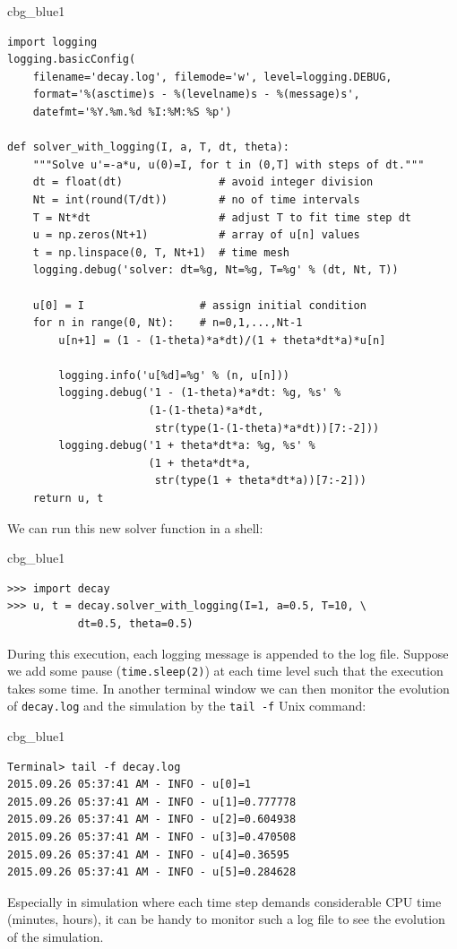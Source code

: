 \documentclass[%
oneside,                 %
final,                   %
10pt]{article}
\newenvironment{_cod_tight}[1]{
   \def\FrameCommand{\colorbox{#1}}
   \FrameRule0.6pt\MakeFramed {\FrameRestore}\vskip3mm}
   {\vskip0mm\endMakeFramed}
\newenvironment{cod}[1]{
\bgroup\rmfamily
\fboxsep=0mm\relax
\begin{_cod_tight}{#1}
\list{}{\parsep=-2mm\parskip=0mm\topsep=0pt\leftmargin=2mm
\rightmargin=2\leftmargin\leftmargin=4pt\relax}
\item\relax}
{\endlist\end{_cod_tight}\egroup}
\begin{document}
\begin{cod}{cbg_blue1}\begin{Verbatim}[numbers=none,fontsize=\fontsize{9pt}{9pt},baselinestretch=0.95,xleftmargin=2mm]
import logging
logging.basicConfig(
    filename='decay.log', filemode='w', level=logging.DEBUG,
    format='%(asctime)s - %(levelname)s - %(message)s',
    datefmt='%Y.%m.%d %I:%M:%S %p')

def solver_with_logging(I, a, T, dt, theta):
    """Solve u'=-a*u, u(0)=I, for t in (0,T] with steps of dt."""
    dt = float(dt)               # avoid integer division
    Nt = int(round(T/dt))        # no of time intervals
    T = Nt*dt                    # adjust T to fit time step dt
    u = np.zeros(Nt+1)           # array of u[n] values
    t = np.linspace(0, T, Nt+1)  # time mesh
    logging.debug('solver: dt=%g, Nt=%g, T=%g' % (dt, Nt, T))

    u[0] = I                  # assign initial condition
    for n in range(0, Nt):    # n=0,1,...,Nt-1
        u[n+1] = (1 - (1-theta)*a*dt)/(1 + theta*dt*a)*u[n]

        logging.info('u[%d]=%g' % (n, u[n]))
        logging.debug('1 - (1-theta)*a*dt: %g, %s' %
                      (1-(1-theta)*a*dt,
                       str(type(1-(1-theta)*a*dt))[7:-2]))
        logging.debug('1 + theta*dt*a: %g, %s' %
                      (1 + theta*dt*a,
                       str(type(1 + theta*dt*a))[7:-2]))
    return u, t
\end{Verbatim}
\end{cod}
\noindent
We can run this new solver function in a shell:

\begin{cod}{cbg_blue1}\begin{Verbatim}[numbers=none,fontsize=\fontsize{9pt}{9pt},baselinestretch=0.95,xleftmargin=2mm]
>>> import decay
>>> u, t = decay.solver_with_logging(I=1, a=0.5, T=10, \ 
           dt=0.5, theta=0.5)
\end{Verbatim}
\end{cod}
\noindent
During this execution, each logging message is appended to the log file.
Suppose we add some pause (\texttt{time.sleep(2)}) at each time level such that
the execution takes some time. In another terminal window we can then
monitor the evolution of \texttt{decay.log} and the simulation
by the \texttt{tail -f} Unix command:

\begin{cod}{cbg_blue1}\begin{Verbatim}[numbers=none,fontsize=\fontsize{9pt}{9pt},baselinestretch=0.95,xleftmargin=2mm]
Terminal> tail -f decay.log
2015.09.26 05:37:41 AM - INFO - u[0]=1
2015.09.26 05:37:41 AM - INFO - u[1]=0.777778
2015.09.26 05:37:41 AM - INFO - u[2]=0.604938
2015.09.26 05:37:41 AM - INFO - u[3]=0.470508
2015.09.26 05:37:41 AM - INFO - u[4]=0.36595
2015.09.26 05:37:41 AM - INFO - u[5]=0.284628
\end{Verbatim}
\end{cod}
\noindent
Especially in simulation where each time step demands considerable
CPU time (minutes, hours), it can be handy to monitor such a log file
to see the evolution of the simulation.
\end{document}
